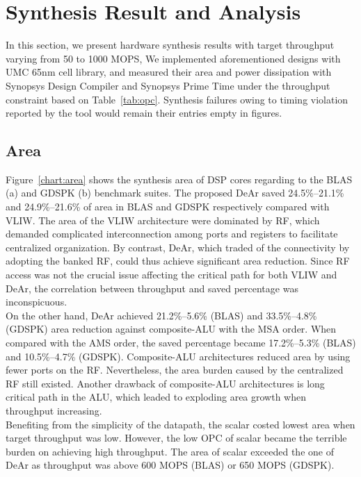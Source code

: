 \section{Synthesis Result and Analysis}
{
    In this section, we present hardware synthesis results with target throughput varying from 50 to 1000 MOPS, 
    We implemented aforementioned designs with UMC 65nm cell library, 
    and measured their area and power dissipation with Synopsys Design Compiler and Synopsys Prime Time under the throughput constraint based on Table~\ref{tab:opc}.
    Synthesis failures owing to timing violation reported by the tool would remain their entries empty in figures.
    \subsection{Area}
    Figure~\ref{chart:area} shows the synthesis area of DSP cores regarding to the BLAS (a) and GDSPK (b) benchmark suites.
    The proposed DeAr saved 24.5\%--21.1\% and 24.9\%--21.6\% of area in BLAS and GDSPK respectively compared with VLIW.
    The area of the VLIW architecture were dominated by RF, 
    which demanded complicated interconnection among ports and registers to facilitate centralized organization.
    By contrast, DeAr, which traded of the connectivity by adopting the banked RF, could thus achieve significant area reduction.
    Since RF access was not the crucial issue affecting the critical path for both VLIW and DeAr, 
    the correlation between throughput and saved percentage was inconspicuous.
    \\\indent On the other hand, DeAr achieved 21.2\%--5.6\% (BLAS) and 33.5\%--4.8\% (GDSPK) area reduction against composite-ALU with the MSA order.
    When compared with the AMS order, the saved percentage became 17.2\%--5.3\% (BLAS) and 10.5\%--4.7\% (GDSPK).
    Composite-ALU architectures reduced area by using fewer ports on the RF.
    Nevertheless, the area burden caused by the centralized RF still existed.
    Another drawback of composite-ALU architectures is long critical path in the ALU, 
    which leaded to exploding area growth when throughput increasing.
    \\\indent Benefiting from the simplicity of the datapath, 
    the scalar costed lowest area when target throughput was low.
    However, the low OPC of scalar became the terrible burden on achieving high throughput.
    The area of scalar exceeded the one of DeAr as throughput was above 600 MOPS (BLAS) or 650 MOPS (GDSPK).
}
